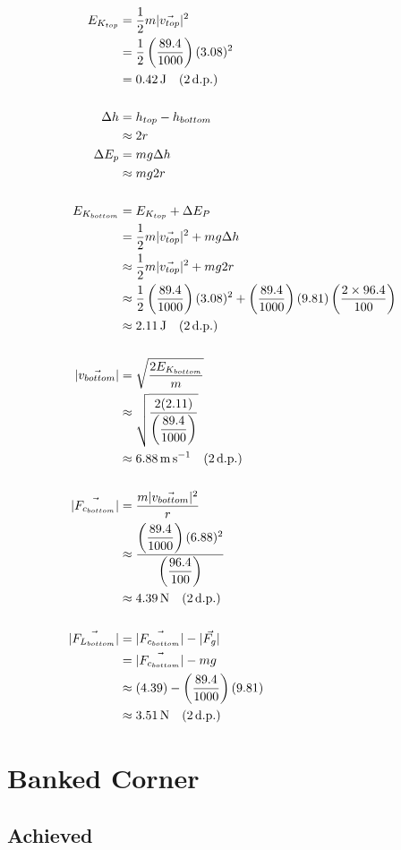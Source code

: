 \documentclass[11pt, a4paper]{article}
\begin{document}
	\begin{align}
		E_{K_{top}}&=\frac{1}{2}m|\vec{v_{top}}|^2\\
		&=\frac{1}{2}\left(\frac{89.4}{1000}\right)(3.08)^2\\
		&=\SI{0.42}{\joule} \quad (2\, \text{d.p.})\\[\baselineskip]
		\Delta h&=h_{top}-h_{bottom}\\
		&\approx2r\\
		\Delta E_p&=mg\Delta h\\
		&\approx mg2r\\[\baselineskip]
		E_{K_{bottom}}&=E_{K_{top}}+\Delta E_P\\
		&=\frac{1}{2}m|\vec{v_{top}}|^2+mg\Delta h\\
		&\approx \frac{1}{2}m|\vec{v_{top}}|^2+mg2r\\
		&\approx \frac{1}{2}\left(\frac{89.4}{1000}\right)(3.08)^2 + \left(\frac{89.4}{1000}\right)(9.81)\left(\frac{2\times96.4}{100}\right)\\
		&\approx \SI{2.11}{\joule} \quad (2\, \text{d.p.})\\[\baselineskip]
		|\vec{v_{bottom}}|&=\sqrt{\frac{2E_{K_{bottom}}}{m}}\\
		&\approx \sqrt{\frac{2(2.11)}{\left(\dfrac{89.4}{1000}\right)}}\\
		&\approx \SI{6.88}{\meter\per\second} \quad (2\, \text{d.p.})\\[\baselineskip]
		|\vec{F_{c_{bottom}}}|&=\frac{m|\vec{v_{bottom}}|^2}{r}\\
		&\approx\frac{\left(\dfrac{89.4}{1000}\right)(6.88)^2}{\left(\dfrac{96.4}{100}
			\right)}\\
		&\approx \SI{4.39}{\newton} \quad (2\, \text{d.p.})\\[\baselineskip]
		|\vec{F_{L_{bottom}}}|&=|\vec{F_{c_{bottom}}}|-|\vec{F_g}|\\
		&=|\vec{F_{c_{bottom}}}|-mg\\
		&\approx(4.39)-\left(\frac{89.4}{1000}\right)(9.81)\\
		&\approx \SI{3.51}{\newton} \quad (2\, \text{d.p.})
	\end{align}
	
	
	\section{Banked Corner}
	\subsection{Achieved}
\end{document}
